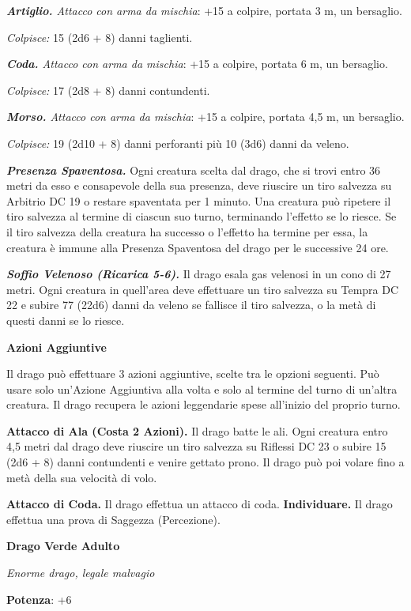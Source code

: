\begin{multicols}{2}
\emph{\textbf{Artiglio.} Attacco con arma da mischia}: +15 a colpire,
portata 3 m, un bersaglio.

\emph{Colpisce:} 15 (2d6 + 8) danni taglienti.

\emph{\textbf{Coda.} Attacco con arma da mischia}: +15 a colpire,
portata 6 m, un bersaglio.

\emph{Colpisce:} 17 (2d8 + 8) danni contundenti.

\emph{\textbf{Morso.} Attacco con arma da mischia}: +15 a colpire,
portata 4,5 m, un bersaglio.

\emph{Colpisce:} 19 (2d10 + 8) danni perforanti più 10 (3d6) danni da
veleno.

\emph{\textbf{Presenza Spaventosa.}} Ogni creatura scelta dal drago, che
si trovi entro 36 metri da esso e consapevole della sua presenza, deve
riuscire un tiro salvezza su Arbitrio DC 19 o restare spaventata per 1
minuto. Una creatura può ripetere il tiro salvezza al termine di ciascun
suo turno, terminando l'effetto se lo riesce. Se il tiro salvezza della
creatura ha successo o l'effetto ha termine per essa, la creatura è
immune alla Presenza Spaventosa del drago per le successive 24 ore.

\emph{\textbf{Soffio Velenoso (Ricarica 5-6).}} Il drago esala gas
velenosi in un cono di 27 metri. Ogni creatura in quell'area deve
effettuare un tiro salvezza su Tempra DC 22 e subire 77 (22d6)
danni da veleno se fallisce il tiro salvezza, o la metà di questi danni
se lo riesce.

\textbf{Azioni Aggiuntive}

Il drago può effettuare 3 azioni aggiuntive, scelte tra le opzioni
seguenti. Può usare solo un'Azione Aggiuntiva alla volta e solo al
termine del turno di un'altra creatura. Il drago recupera le azioni
leggendarie spese all'inizio del proprio turno.

\textbf{Attacco di Ala (Costa 2 Azioni).} Il drago batte le ali. Ogni
creatura entro 4,5 metri dal drago deve riuscire un tiro salvezza su Riflessi DC 23 o subire 15 (2d6 + 8) danni contundenti e venire gettato
prono. Il drago può poi volare fino a metà della sua velocità di volo.

\textbf{Attacco di Coda.} Il drago effettua un attacco di coda.
\textbf{Individuare.} Il drago effettua una prova di Saggezza
(Percezione).

\textbf{Drago Verde Adulto}

\emph{Enorme drago, legale malvagio}

\textbf{Potenza}: +6


\end{multicols}

